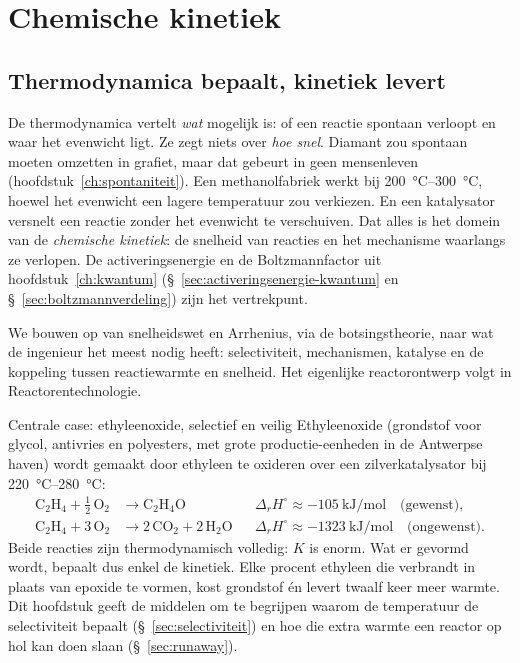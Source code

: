 \chapter{Chemische kinetiek}
\label{ch:kinetiek}

\section{Thermodynamica bepaalt, kinetiek levert}

De thermodynamica vertelt \emph{wat} mogelijk is: of een reactie spontaan verloopt en waar het evenwicht ligt. Ze zegt niets over \emph{hoe snel}. Diamant zou spontaan moeten omzetten in grafiet, maar dat gebeurt in geen mensenleven (hoofdstuk~\ref{ch:spontaniteit}). Een methanolfabriek werkt bij \SIrange{200}{300}{\celsius}, hoewel het evenwicht een lagere temperatuur zou verkiezen. En een katalysator versnelt een reactie zonder het evenwicht te verschuiven. Dat alles is het domein van de \emph{chemische kinetiek}: de snelheid van reacties en het mechanisme waarlangs ze verlopen. De activeringsenergie en de Boltzmannfactor uit hoofdstuk~\ref{ch:kwantum} (\S~\ref{sec:activeringsenergie-kwantum} en \S~\ref{sec:boltzmannverdeling}) zijn het vertrekpunt.

We bouwen op van snelheidswet en Arrhenius, via de botsingstheorie, naar wat de ingenieur het meest nodig heeft: selectiviteit, mechanismen, katalyse en de koppeling tussen reactiewarmte en snelheid. Het eigenlijke reactorontwerp volgt in Reactorentechnologie.

\begin{toepassing}{Centrale case: ethyleenoxide, selectief en veilig}
Ethyleenoxide (grondstof voor glycol, antivries en polyesters, met grote productie-eenheden in de Antwerpse haven) wordt gemaakt door ethyleen te oxideren over een zilverkatalysator bij \SIrange{220}{280}{\celsius}:
\begin{align*}
\mathrm{C_2H_4 + \tfrac12\,O_2} &\rightarrow \mathrm{C_2H_4O} && \Delta_rH^\circ \approx \SI{-105}{\kilo\joule\per\mole} \quad\text{(gewenst)},\\
\mathrm{C_2H_4 + 3\,O_2} &\rightarrow \mathrm{2\,CO_2 + 2\,H_2O} && \Delta_rH^\circ \approx \SI{-1323}{\kilo\joule\per\mole} \quad\text{(ongewenst)}.
\end{align*}
Beide reacties zijn thermodynamisch volledig: $K$ is enorm. Wat er gevormd wordt, bepaalt dus enkel de kinetiek. Elke procent ethyleen die verbrandt in plaats van epoxide te vormen, kost grondstof \'en levert twaalf keer meer warmte. Dit hoofdstuk geeft de middelen om te begrijpen waarom de temperatuur de selectiviteit bepaalt (\S~\ref{sec:selectiviteit}) en hoe die extra warmte een reactor op hol kan doen slaan (\S~\ref{sec:runaway}).
\end{toepassing}

